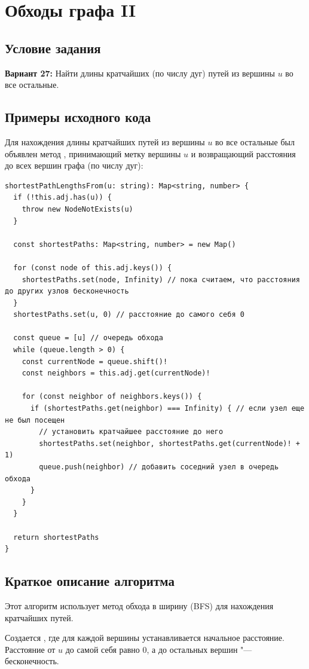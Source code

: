 \section{Обходы графа II}
\subsection{Условие задания}
\textbf{Вариант 27:} Найти длины кратчайших (по числу дуг) путей из вершины $u$ во все остальные.

\subsection{Примеры исходного кода}
Для нахождения длины кратчайших путей из вершины $u$ во все остальные
был объявлен метод , принимающий
метку вершины $u$ и возвращающий расстояния до всех вершин графа (по числу дуг):
\begin{verbatim}
shortestPathLengthsFrom(u: string): Map<string, number> {
  if (!this.adj.has(u)) {
    throw new NodeNotExists(u)
  }

  const shortestPaths: Map<string, number> = new Map()

  for (const node of this.adj.keys()) {
    shortestPaths.set(node, Infinity) // пока считаем, что расстояния до других узлов бесконечность
  }
  shortestPaths.set(u, 0) // расстояние до самого себя 0

  const queue = [u] // очередь обхода
  while (queue.length > 0) {
    const currentNode = queue.shift()!
    const neighbors = this.adj.get(currentNode)!

    for (const neighbor of neighbors.keys()) {
      if (shortestPaths.get(neighbor) === Infinity) { // если узел еще не был посещен
        // установить кратчайшее расстояние до него
        shortestPaths.set(neighbor, shortestPaths.get(currentNode)! + 1)
        queue.push(neighbor) // добавить соседний узел в очередь обхода
      }
    }
  }

  return shortestPaths
}
\end{verbatim}

\subsection{Краткое описание алгоритма}
Этот алгоритм использует метод обхода в ширину (BFS) для нахождения кратчайших путей.

Создается , где для каждой вершины устанавливается начальное расстояние.
Расстояние от $u$ до самой себя равно $0$, а до остальных вершин "--- бесконечность.

